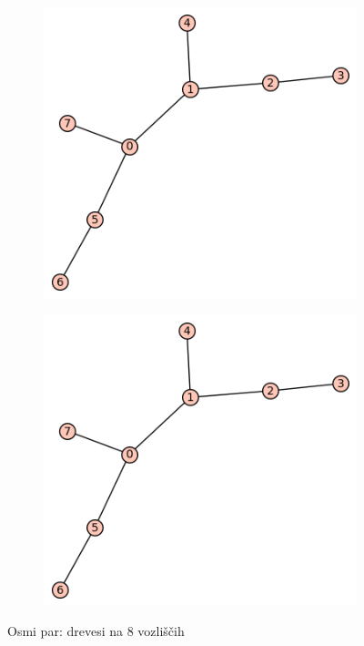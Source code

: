 \documentclass[12pt, a4paper]{article}
\begin{document}
\begin{center}
\begin{center}
\begin{figure}[!htb]
\centering
\begin{subfigure}{0.5\textwidth}
  \centering
  \includegraphics[width=0.4\linewidth]{t-30}
\end{subfigure}%
\begin{subfigure}{0.5\textwidth}
  \centering
  \includegraphics[width=0.5\linewidth]{t-30}
\end{subfigure}
\caption{Osmi par: drevesi na 8 vozliščih}
\label{fig:test}
\end{figure}
\end{center}


\end{center}
\end{document}
